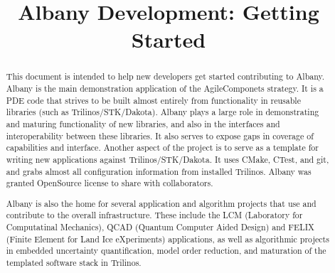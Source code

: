 \documentclass[pdf,12pt,report,strict]{SANDreport}
\title{Albany Development: Getting Started}
\date{}               %
\theoremstyle{remark}
\begin{document}
\maketitle

%
\begin{abstract}
This document is intended to help new developers get started
contributing to Albany. Albany is the main demonstration application
of the AgileComponets strategy. It is a PDE code that strives to be
built almost entirely from functionality in reusable libraries (such
as Trilinos/STK/Dakota). Albany plays a large role in demonstrating
and maturing functionality of new libraries, and also in the
interfaces and interoperability between these libraries. It also
serves to expose gaps in coverage of capabilities and
interface. Another aspect of the project is to serve as a template for
writing new applications against Trilinos/STK/Dakota. It uses CMake,
CTest, and git, and grabs almost all configuration information from
installed Trilinos. Albany was granted OpenSource license to share
with collaborators.

Albany is also the home for several application and algorithm
projects that use and contribute to the overall infrastructure.
These include the LCM (Laboratory for Computatinal Mechanics),
QCAD (Quantum Computer Aided Design) and FELIX (Finite Element for
Land Ice eXperiments) applications, as well as algorithmic projects
in embedded uncertainty quantification, model order reduction, and
maturation of the templated software stack in Trilinos.
\end{abstract}


%

%
\cleardoublepage            %
\tableofcontents
\listoffigures
\listoftables


%
%
\end{document}
